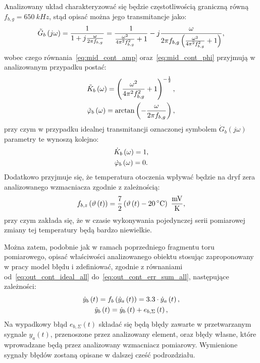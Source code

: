 Analizowany układ charakteryzować się będzie częstotliwością graniczną równą $f_{b,g} = \qty{650}{kHz}$, stąd opisać można jego transmitancje jako:
\begin{equation}
\tilde{G}_{b} \left(j\omega\right) = \frac{1}{1 + j \frac{\omega}{2 \pi f_{b,g}}} = \frac{1}{\frac{\omega^{2}}{4 \pi^{2} f_{b,g}^{2}} + 1} - j \frac{\omega}{2 \pi f_{b,g} \left( \frac{\omega^{2}}{4 \pi^{2} f_{b,g}^{2}} + 1 \right) } \label{eq:sym_partb_trans},
\end{equation}
wobec czego równania~\eqref{eq:mid_cont_amp} oraz~\eqref{eq:mid_cont_phi} przyjmują w analizowanym przypadku postać:
\begin{gather}
\tilde{K}_{b} \left(\omega\right) = \left( \frac{\omega^{2}}{4 \pi^{2} f_{b,g}^{2}} + 1 \right)^{-\frac{1}{2}} \label{eq:sym_partb_amp_real}, \\
\tilde{\varphi}_{b} \left(\omega\right) = \arctan \left( -\frac{\omega}{2 \pi f_{b,g}} \right) \label{eq:sym_partb_phi_real},
\end{gather}
przy czym w przypadku idealnej transmitancji oznaczonej symbolem $\dot{G}_{b}(j\omega)$ parametry te wynoszą kolejno:
\begin{gather}
\dot{K}_{b} \left(\omega\right) = 1 \label{eq:sym_partb_amp_ideal}, \\
\dot{\varphi}_{b} \left(\omega\right) = 0 \label{eq:sym_partb_phi_ideal}.
\end{gather}
Dodatkowo przyjmuje się, że temperatura otoczenia wpływać będzie na dryf zera analizowanego wzmacniacza zgodnie z zależnością:
\begin{equation}
f_{b,z} \left( \vartheta \emb{t} \right) = \frac{7}{2} \left( \vartheta \emb{t} - \qty{20}{\degreeCelsius} \right)~\unit{\frac{mV}{K}} \label{eq:sym_partb_temp_err},
\end{equation}
przy czym zakłada się, że w czasie wykonywania pojedynczej serii pomiarowej zmiany tej temperatury będą bardzo niewielkie.

Można zatem, podobnie jak w ramach poprzedniego fragmentu toru pomiarowego, opisać właściwości analizowanego obiektu stosując zaproponowany w pracy model błędu i zdefiniować, zgodnie z równaniami od~\eqref{eq:out_cont_ideal_all} do~\eqref{eq:out_cont_err_sum_all}, następujące zależności:
\begin{gather}
\dot{y}_{b} \left(t\right) = f_{b} \left( \dot{y}_{a} \left(t\right) \right) = 3.3 \cdot \dot{y}_{a} \left(t\right) \label{eq:sym_partb_out_ideal}, \\
\tilde{y}_{b} \left(t\right) = \dot{y}_{b} \left(t\right) + e_{b,\Sigma} \left(t\right) \label{eq:sym_partb_out_real},
\end{gather}
Na wypadkowy błąd $e_{b,\Sigma}(t)$ składać się będą błędy zawarte w przetwarzanym sygnale $y_{a}(t)$, przenoszone przez analizowany element, oraz błędy własne, które wprowadzane będą przez analizowany wzmacniacz pomiarowy. Wymienione sygnały błędów zostaną opisane w dalszej cześć podrozdziału.

